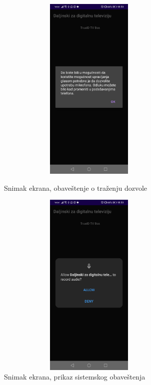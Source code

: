 \documentclass[implementacija.tex]{subfiles}
\begin{document}
\begin{figure}[h!]
\centering
\begin{minipage}{.5\textwidth}
   \centering
  \includegraphics[width=9cm,height=9cm,keepaspectratio]{Implementacija/snimci_ekrana/1_obavestenje_za_dozvolu.jpg}
  \caption{Snimak ekrana, obaveštenje o traženju dozvole}
    \label{fig:dozvola}

\end{minipage}%
\begin{minipage}{.5\textwidth}
   \centering
  \includegraphics[width=9cm,height=9cm,keepaspectratio]{Implementacija/snimci_ekrana/2_sistemska_dozvola.jpg}
  \caption{Snimak ekrana, prikaz sistemskog obaveštenja}
    \label{fig:sistemsko_obavestenje}
\end{minipage}
\end{figure}
\end{document}
